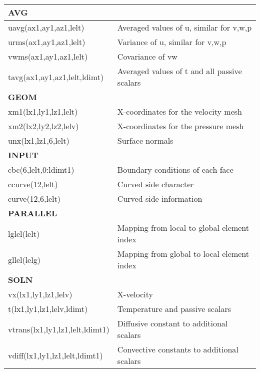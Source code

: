 \begin{table}
    \centering
    \begin{tabular}{l l}
        \multicolumn{2}{l}{\textbf{AVG}}\\ \hline
uavg(ax1,ay1,az1,lelt)           & Averaged values of u, similar for v,w,p\\
urms(ax1,ay1,az1,lelt)           & Variance of u, similar for v,w,p\\
vwms(ax1,ay1,az1,lelt)           & Covariance of vw\\
tavg(ax1,ay1,az1,lelt,ldimt)     & Averaged values of t and all passive scalars\\

\multicolumn{2}{l}{\textbf{GEOM}}\\ \hline
xm1(lx1,ly1,lz1,lelt)            & X-coordinates for the velocity mesh \\
xm2(lx2,ly2,lz2,lelv)            & X-coordinates for the pressure mesh\\
unx(lx1,lz1,6,lelt)              & Surface normals \\

\multicolumn{2}{l}{\textbf{INPUT}}\\ \hline

cbc(6,lelt,0:ldimt1)             & Boundary conditions of each face\\
ccurve(12,lelt)                  & Curved side character \\
curve(12,6,lelt)                 & Curved side information\\

\multicolumn{2}{l}{\textbf{PARALLEL}}\\ \hline
lglel(lelt)                      & 	Mapping from local to global element index\\
gllel(lelg)                      & 	Mapping from global to local element index\\

\multicolumn{2}{l}{\textbf{SOLN}}\\ \hline
vx(lx1,ly1,lz1,lelv)            & X-velocity\\
t(lx1,ly1,lz1,lelv,ldimt)       & Temperature and passive scalars\\
vtrans(lx1,ly1,lz1,lelt,ldimt1) & Diffusive constant to additional scalars\\
vdiff(lx1,ly1,lz1,lelt,ldimt1)  & Convective constants to additional scalars\\


\end{tabular}
\end{table}
